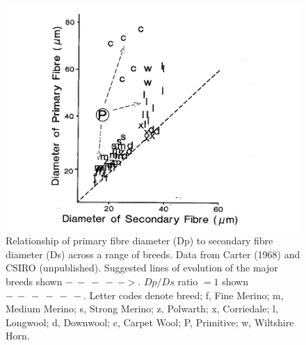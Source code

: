 %

\begin{figure}[h]
  \centering
  \includegraphics[width=1.3\textwidth, trim = 80 0 0 120]{images/fig5.png}
  \caption{   Relationship of primary fibre diameter (Dp) to secondary fibre
	      diameter (Ds) across a range of breeds.  Data from Carter (1968)
	  and CSIRO (unpublished).  Suggested lines of evolution of the
          major breeds shown $-\ -\ -\ -\ ->$.  $Dp/Ds$ ratio $ = 1$ 
	  shown $-\ -\ -\ -\ -\ -$. Letter codes denote breed;
f,  Fine Merino;
m,  Medium Merino;
s,  Strong Merino;
z,  Polwarth;
x,  Corriedale;
l,  Longwool;
d,  Downwool;
c,  Carpet Wool;
P,  Primitive;
w,  Wiltshire Horn. }
  \label{fig:5}
\end{figure}

%
